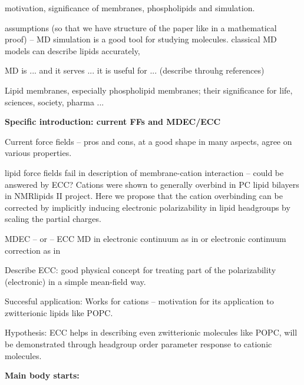 \documentclass[aip,jcp]{revtex4}
\begin{document}
 motivation, significance of membranes, phospholipids and simulation.

 assumptions (so that we have structure of the paper like in a mathematical proof) -- 
 MD simulation is a good tool for studying molecules.
 classical MD models can describe lipids accurately, 

 MD is ... and it serves ... it is useful for ... (describe throuhg references)

 Lipid membranes, especially phospholipid membranes; their significance for life, sciences, society, pharma ...

\textbf{Specific introduction: current FFs and MDEC/ECC}

 Current force fields -- pros and cons, at a good shape in many aspects, agree on various properties. 

 lipid force fields fail in description of membrane-cation interaction -- could be answered by ECC? 
Cations were shown to generally overbind in PC lipid bilayers in
NMRlipids II project. Here we propose that the cation overbinding can
be corrected by implicitly inducing electronic polarizability in
lipid headgroups by scaling the partial charges.

MDEC -- or -- ECC 
MD in electronic continuum as in \cite{Leontyev2015} or electronic continuum correction as in \cite{Jungwirth2015}

Describe ECC: good physical concept for treating part of the polarizability (electronic) in a simple mean-field way.

Succesful application: Works for cations \cite{Jungwirth2015,Kohagen..} -- motivation for its application to zwitterionic lipids like POPC.

Hypothesis: ECC helps in describing even zwitterionic molecules like POPC, will be demonstrated through headgroup order parameter response to cationic molecules.

\textbf{Main body starts:}
\end{document}
